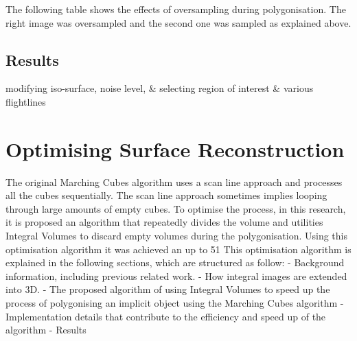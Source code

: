 \documentclass{subfiles}
\begin{document}
\par The following table shows the effects of oversampling during polygonisation. The right image was oversampled and the second one was sampled as explained above.




\subsection{Results}

 modifying iso-surface, noise level, \&
 selecting region of interest \&
 various flightlines



\section{Optimising Surface Reconstruction}\label{sec:OptimisationSurfaceReconstruction}
The original Marching Cubes algorithm uses a scan line approach and processes all the cubes sequentially. The scan line approach sometimes implies looping through large amounts of empty cubes. To optimise the process, in this research, it is proposed an algorithm that repeatedly divides the volume and utilities Integral Volumes to discard empty volumes during the polygonisation. Using this optimisation algorithm it was achieved an up to 51%
This optimisation algorithm is explained in the following sections, which are structured as follow:
-	Background information, including previous related work. 
-	How integral images are extended into 3D. 
-	The proposed algorithm of using Integral Volumes to speed up the process of polygonising an implicit object using the Marching Cubes algorithm
-	Implementation details that contribute to the efficiency and speed up of the algorithm
-	Results
\end{document}
